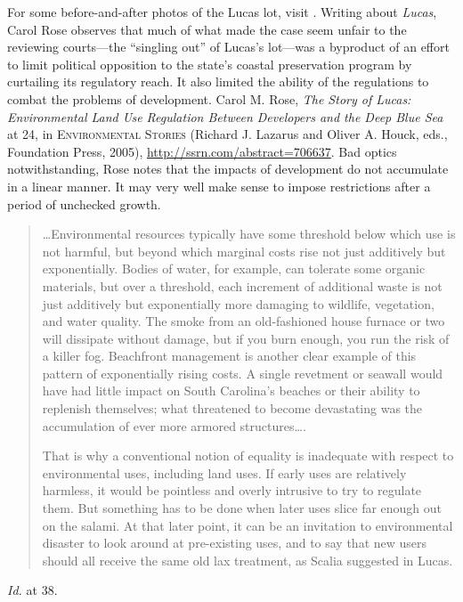 

\item For some before-and-after photos of the Lucas lot, visit
. Writing about
\textit{Lucas}, Carol Rose observes that much of what made the case seem unfair
to the reviewing courts---the ``singling out'' of Lucas's lot---was a byproduct
of an effort to limit political opposition to the state's coastal preservation
program by curtailing its regulatory reach. It also limited the ability of the
regulations to combat the problems of development. Carol M. Rose, \textit{The
Story of Lucas: Environmental Land Use Regulation Between Developers and the
Deep Blue Sea} at 24, in \textsc{Environmental Stories} (Richard J. Lazarus and
Oliver A. Houck, eds., Foundation Press, 2005),
\url{http://ssrn.com/abstract=706637}. Bad optics notwithstanding, Rose notes
that the impacts of development do not accumulate in a linear manner. It may
very well make sense to impose restrictions after a period of unchecked growth.
\begin{quotation}
\ldots Environmental resources typically have some threshold below which use is
not harmful, but beyond which marginal costs rise not just additively but
exponentially. Bodies of water, for example, can tolerate some organic
materials, but over a threshold, each increment of additional waste is not just
additively but exponentially more damaging to wildlife, vegetation, and water
quality. The smoke from an old-fashioned house furnace or two will dissipate
without damage, but if you burn enough, you run the risk of a killer fog.
Beachfront management is another clear example of this pattern of exponentially
rising costs. A single revetment or seawall would have had little impact on
South Carolina's beaches or their ability to replenish themselves; what
threatened to become devastating was the accumulation of ever more armored
structures\ldots.

That is why a conventional notion of equality is inadequate with respect to
environmental uses, including land uses. If early uses are relatively harmless,
it would be pointless and overly intrusive to try to regulate them. But
something has to be done when later uses slice far enough out on the salami. At
that later point, it can be an invitation to environmental disaster to look
around at pre-existing uses, and to say that new users should all receive the
same old lax treatment, as Scalia suggested in Lucas.
\end{quotation}
\textit{Id.} at 38.

